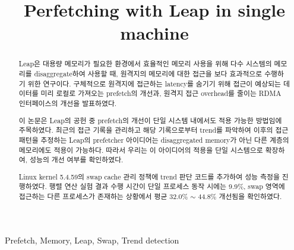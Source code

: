 \documentclass[conference,11pt]{IEEEtran}
\begin{document}
\begin{CJK}{UTF8}{}

    \title{Perfetching with Leap in single machine%
    }

    \author{
    }


    \maketitle

    \begin{abstract}

        Leap은 대용량 메모리가 필요한 환경에서 효율적인 메모리 사용을 위해 다수 시스템의 메모리를 disaggregate하여 사용할 때, 원격지의 메모리에 대한 접근을 보다 효과적으로 수행하기 위한 연구이다. 구체적으로 원격지에 접근하는 latency를 숨기기 위해 접근이 예상되는 데이터를 미리 로컬로 가져오는 prefetch의 개선과, 원격지 접근 overhead를 줄이는 RDMA 인터페이스의 개선을 발표하였다.

        이 논문은 Leap의 공헌 중 prefetch의 개선이 단일 시스템 내에서도 적용 가능한 방법임에 주목하였다. 최근의 접근 기록을 관리하고 해당 기록으로부터 trend를 파악하여 이후의 접근 패턴을 추정하는 Leap의 prefetcher 아이디어는 disaggregated memory가 아닌 다른 계층의 메모리에도 적용이 가능하다. 따라서 우리는 이 아이디어의 적용을 단일 시스템으로 확장하여, 성능의 개선 여부를 확인하였다.

        Linux kernel 5.4.59의 swap cache 관리 정책에 trend 판단 코드를 추가하여 성능 측정을 진행하였다. 행렬 연산 실험 결과 수행 시간이 단일 프로세스 동작 시에는 9.9\%, swap 영역에 접근하는 다른 프로세스가 존재하는 상황에서 평균 32.0\% $\sim$ 44.8\% 개선됨을 확인하였다.
    \end{abstract}

    \begin{IEEEkeywords}
        Prefetch, Memory, Leap, Swap, Trend detection
    \end{IEEEkeywords}


\end{CJK}
\end{document}
